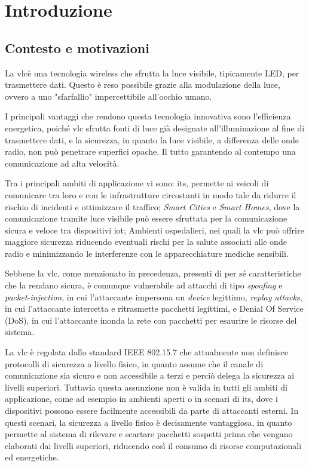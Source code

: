 \chapter{Introduzione}
\label{cap:introduzione}

\section{Contesto e motivazioni}
La \gls{vlc}\glsfirstoccur è una tecnologia wireless che sfrutta la luce visibile, tipicamente LED, per trasmettere dati. Questo è reso possibile grazie alla modulazione della luce, ovvero a uno "sfarfallio" impercettibile all'occhio umano.

I principali vantaggi che rendono questa tecnologia innovativa sono l'efficienza energetica, poiché \gls{vlc} sfrutta fonti di luce già designate all'illuminazione al fine di trasmettere dati, e la sicurezza, in quanto la luce visibile, a differenza delle onde radio, non può penetrare superfici opache. Il tutto garantendo al contempo una comunicazione ad alta velocità.

Tra i principali ambiti di applicazione vi sono: \gls{its}\glsfirstoccur, permette ai veicoli di comunicare tra loro e con le infrastrutture circostanti in modo tale da ridurre il rischio di incidenti e ottimizzare il traffico; \textit{Smart Cities} e \textit{Smart Homes}, dove la comunicazione tramite luce visibile può essere sfruttata per la comunicazione sicura e veloce tra dispositivi \gls{iot}\glsfirstoccur; Ambienti ospedalieri, nei quali la \gls{vlc} può offrire maggiore sicurezza riducendo eventuali rischi per la salute associati alle onde radio e minimizzando le interferenze con le apparecchiature mediche sensibili.

Sebbene la \gls{vlc}, come menzionato in precedenza, presenti di per sé caratteristiche che la rendano sicura, è comunque vulnerabile ad attacchi di tipo \textit{spoofing} e \textit{packet-injection}, in cui l'attaccante impersona un \textit{device} legittimo, \textit{replay attacks}, in cui l'attaccante intercetta e ritrasmette pacchetti legittimi, e Denial Of Service (DoS), in cui l'attaccante inonda la rete con pacchetti per esaurire le risorse del sistema.

La \gls{vlc} è regolata dallo standard IEEE 802.15.7 che attualmente non definisce protocolli di sicurezza a livello fisico, in quanto assume che il canale di comunicazione sia sicuro e non accessibile a terzi e perciò delega la sicurezza ai livelli superiori. Tuttavia questa assunzione non è valida in tutti gli ambiti di applicazione, come ad esempio in ambienti aperti o in scenari di \gls{its}, dove i dispositivi possono essere facilmente accessibili da parte di attaccanti esterni.
In questi scenari, la sicurezza a livello fisico è decisamente vantaggiosa, in quanto permette al sistema di rilevare e scartare pacchetti sospetti prima che vengano elaborati dai livelli superiori, riducendo così il consumo di risorse computazionali ed energetiche.

